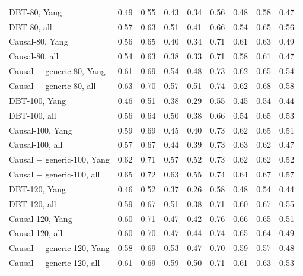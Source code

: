 \begin{tabular}{@{}lcccccccc@{}}
\quad DBT-80, Yang & 0.49 & 0.55 & 0.43 & 0.34 & 0.56 & 0.48 & 0.58 & 0.47 \\
\quad DBT-80, all & 0.57 & 0.63 & 0.51 & 0.41 & 0.66 & 0.54 & 0.65 & 0.56 \\
\quad Causal-80, Yang & 0.56 & 0.65 & 0.40 & 0.34 & 0.71 & 0.61 & 0.63 & 0.49 \\
\quad Causal-80, all & 0.54 & 0.63 & 0.38 & 0.33 & 0.71 & 0.58 & 0.61 & 0.47 \\
\quad Causal $-$ generic-80, Yang & 0.61 & 0.69 & 0.54 & 0.48 & 0.73 & 0.62 & 0.65 & 0.54 \\
\quad Causal $-$ generic-80, all & 0.63 & 0.70 & 0.57 & 0.51 & 0.74 & 0.62 & 0.68 & 0.58 \\
\quad DBT-100, Yang & 0.46 & 0.51 & 0.38 & 0.29 & 0.55 & 0.45 & 0.54 & 0.44 \\
\quad DBT-100, all & 0.56 & 0.64 & 0.50 & 0.38 & 0.66 & 0.54 & 0.65 & 0.53 \\
\quad Causal-100, Yang & 0.59 & 0.69 & 0.45 & 0.40 & 0.73 & 0.62 & 0.65 & 0.51 \\
\quad Causal-100, all & 0.57 & 0.67 & 0.44 & 0.39 & 0.73 & 0.63 & 0.62 & 0.47 \\
\quad Causal $-$ generic-100, Yang & 0.62 & 0.71 & 0.57 & 0.52 & 0.73 & 0.62 & 0.62 & 0.52 \\
\quad Causal $-$ generic-100, all & 0.65 & 0.72 & 0.63 & 0.55 & 0.74 & 0.64 & 0.67 & 0.57 \\
\quad DBT-120, Yang & 0.46 & 0.52 & 0.37 & 0.26 & 0.58 & 0.48 & 0.54 & 0.44 \\
\quad DBT-120, all & 0.59 & 0.67 & 0.51 & 0.38 & 0.71 & 0.60 & 0.67 & 0.55 \\
\quad Causal-120, Yang & 0.60 & 0.71 & 0.47 & 0.42 & 0.76 & 0.66 & 0.65 & 0.51 \\
\quad Causal-120, all & 0.60 & 0.70 & 0.47 & 0.44 & 0.74 & 0.65 & 0.64 & 0.49 \\
\quad Causal $-$ generic-120, Yang & 0.58 & 0.69 & 0.53 & 0.47 & 0.70 & 0.59 & 0.57 & 0.48 \\
\quad Causal $-$ generic-120, all & 0.61 & 0.69 & 0.59 & 0.50 & 0.71 & 0.61 & 0.63 & 0.53 \\
\bottomrule
\end{tabular}
